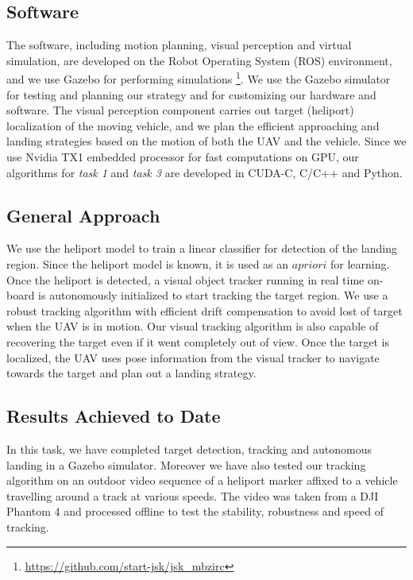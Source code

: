\documentclass{standalone}
\begin{document}
\subsection{Software}

The software, including motion planning, visual perception and virtual simulation, are developed on the Robot Operating System (ROS) environment, and we use Gazebo for performing simulations \footnote{\url{https://github.com/start-jsk/jsk_mbzirc}}. We use the Gazebo simulator for testing and planning our strategy and for customizing our hardware and software. The visual perception component carries out target (heliport) localization of the moving vehicle, and we plan the efficient approaching and landing strategies based on the motion of both the UAV and the vehicle. Since we use Nvidia TX1 embedded processor for fast computations on GPU, our algorithms for \textit{task 1} and \textit{task 3} are developed in CUDA-C, C/C++ and Python. 



\subsection{General Approach}

We use the heliport model to train a linear classifier for detection of the landing region. Since the heliport model is known, it is used as an $a priori$ for learning. Once the heliport is detected, a visual object tracker running in real time on-board is autonomously initialized to start tracking the target region. We use a robust tracking algorithm with efficient drift compensation to avoid lost of target when the UAV is in motion. Our visual tracking algorithm is also capable of recovering the target even if it went completely out of view. Once the target is localized, the UAV uses pose information from the visual tracker to navigate towards the target and plan out a landing strategy.

\subsection{Results Achieved to Date}
In this task, we have completed target detection, tracking and autonomous landing in a Gazebo simulator. 
Moreover we have also tested our tracking algorithm on an outdoor video sequence of a heliport marker affixed to a vehicle travelling around a track at various speeds. The video was taken from a DJI Phantom 4 and processed offline to test the stability, robustness and speed of tracking.
\end{document}
